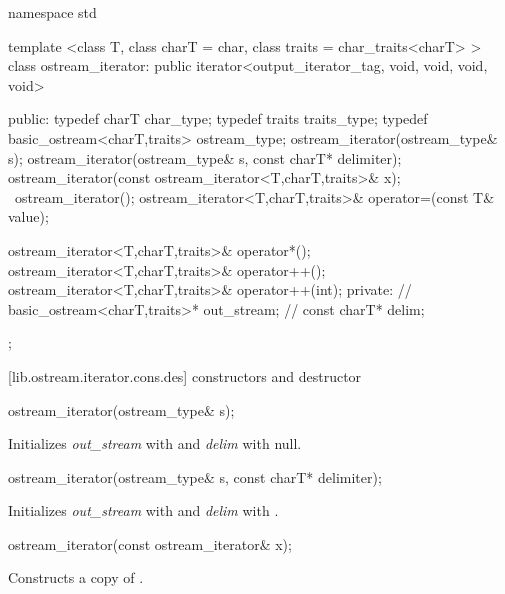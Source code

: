 \begin{codeblock}
namespace std {
  template <class T, class charT = char, class traits = char_traits<charT> >
  class ostream_iterator:
    public iterator<output_iterator_tag, void, void, void, void> {
  public:
    typedef charT char_type;
    typedef traits traits_type;
    typedef basic_ostream<charT,traits> ostream_type;
    ostream_iterator(ostream_type& s);
    ostream_iterator(ostream_type& s, const charT* delimiter);
    ostream_iterator(const ostream_iterator<T,charT,traits>& x);
   ~ostream_iterator();
    ostream_iterator<T,charT,traits>& operator=(const T& value);

    ostream_iterator<T,charT,traits>& operator*();
    ostream_iterator<T,charT,traits>& operator++();
    ostream_iterator<T,charT,traits>& operator++(int);
  private:
    //  basic_ostream<charT,traits>* out_stream;  \expos
    //  const charT* delim;                       \exposr
  };
}
\end{codeblock}

[lib.ostream.iterator.cons.des]{ constructors and destructor}


%
\begin{itemdecl}
ostream_iterator(ostream_type& s);
\end{itemdecl}

\begin{itemdescr}
\pnum
\effects
Initializes \textit{out_stream} with  and \textit{delim} with null.
\end{itemdescr}


%
\begin{itemdecl}
ostream_iterator(ostream_type& s, const charT* delimiter);
\end{itemdecl}

\begin{itemdescr}
\pnum
\effects
Initializes \textit{out_stream} with  and \textit{delim} with .
\end{itemdescr}


%
\begin{itemdecl}
ostream_iterator(const ostream_iterator& x);
\end{itemdecl}

\begin{itemdescr}
\pnum
\effects
Constructs a copy of .
\end{itemdescr}

